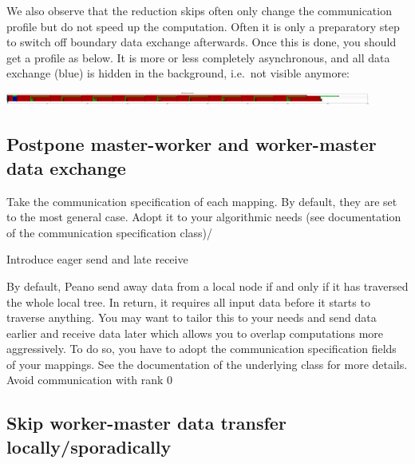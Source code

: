 We also observe that the reduction skips often only change the communication
profile but do not speed up the computation. 
Often it is only a preparatory step to switch off boundary data exchange
afterwards.
Once this is done, you should get a profile as below. 
It is more or less completely asynchronous, and all data exchange (blue) is
hidden in the background, i.e.~not visible anymore:


\begin{center}
  \includegraphics[width=0.9\textwidth]{43_mpi-synchronisation/mpi-phases-after.pdf}
\end{center}



\subsection{Postpone master-worker and worker-master data exchange}
    Take the communication specification of each mapping. By default, they are set to the most general case. Adopt it to your algorithmic needs (see documentation of the communication specification class)/


Introduce eager send and late receive

By default, Peano send away data from a local node if and only if it has traversed the whole local tree. In return, it requires all input data before it starts to traverse anything. You may want to tailor this to your needs and send data earlier and receive data later which allows you to overlap computations more aggressively. To do so, you have to adopt the communication specification fields of your mappings. See the documentation of the underlying class for more details.
Avoid communication with rank 0


\subsection{Skip worker-master data transfer locally/sporadically}
